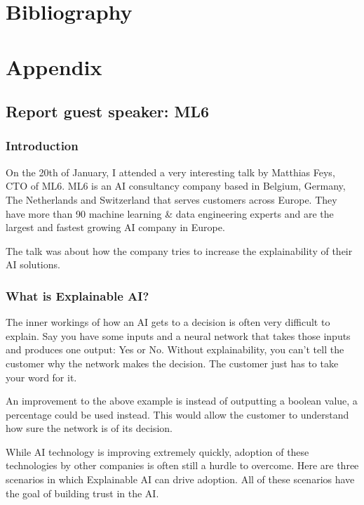 \documentclass{article}
\begin{document}
\newpage
\section{Bibliography}
\renewcommand{\bibname}{}
\printbibliography[heading=none]

\newpage
\section{Appendix}

\subsection{Report guest speaker: ML6}

\subsubsection{Introduction}

On the 20th of January, I attended a very interesting talk by Matthias Feys, 
CTO of ML6. ML6 is an AI consultancy company based in Belgium, Germany, The Netherlands 
and Switzerland that serves customers across Europe. They have more than 90 
machine learning \& data engineering experts and are the largest and fastest 
growing AI company in Europe. 

The talk was about how the company tries to increase the explainability of their AI 
solutions. 

\subsubsection{What is Explainable AI?}

The inner workings of how an AI gets to a decision is often very difficult to explain.
Say you have some inputs and a neural network that takes those inputs and produces
one output: Yes or No. Without explainability, you can't tell the customer why the 
network makes the decision. The customer just has to take your word for it.

An improvement to the above example is instead of outputting a boolean value, 
a percentage could be used instead. This would allow the customer to understand
how sure the network is of its decision.

While AI technology is improving extremely quickly, adoption of these technologies
by other companies is often still a hurdle to overcome. Here are three scenarios in 
which Explainable AI can drive adoption. All of these scenarios have the goal of
building trust in the AI.
\end{document}
